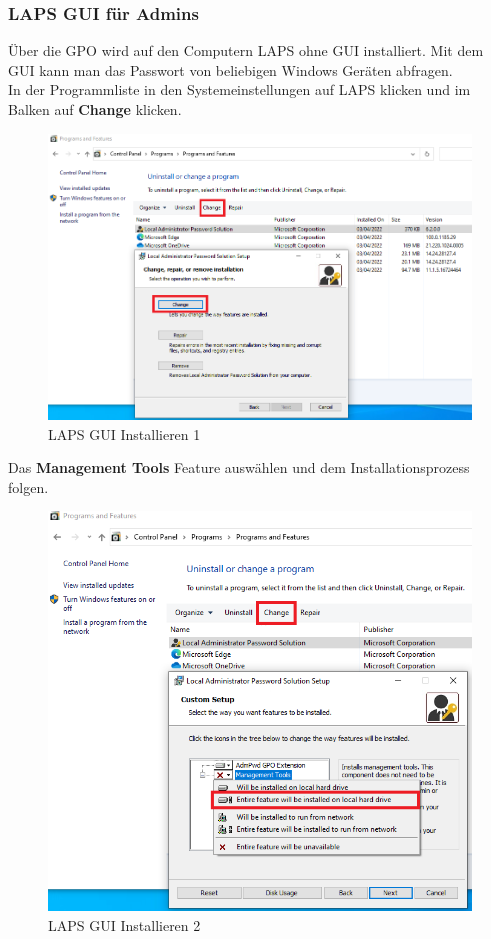 \subsubsection{LAPS GUI für Admins}\label{subsubsec:Laps-Gui}
Über die GPO wird auf den Computern LAPS ohne GUI installiert.
Mit dem GUI kann man das Passwort von beliebigen Windows Geräten abfragen.\\

In der Programmliste in den Systemeinstellungen auf LAPS klicken und im Balken auf \textbf{Change} klicken.
\begin{figure}[H]
    \centering
    \includegraphics[width=0.7\linewidth]{../img/LAPS/laps-ui-install.png}
    \caption{LAPS GUI Installieren 1}
\end{figure}

Das \textbf{Management Tools} Feature auswählen und dem Installationsprozess folgen.
\begin{figure}[H]
    \centering
    \includegraphics[width=0.7\linewidth]{../img/LAPS/laps-ui-install-2.png}
    \caption{LAPS GUI Installieren 2}
\end{figure}


